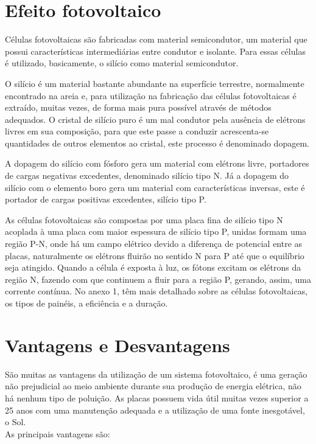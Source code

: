 \section{Efeito fotovoltaico}
Células fotovoltaicas são fabricadas com material semicondutor, um material que possui características intermediárias entre condutor e isolante. Para essas células é utilizado, basicamente, o silício como material semicondutor. 

\par O silício é um material bastante abundante na superfície terrestre, normalmente encontrado na areia e, para utilização na fabricação das células fotovoltaicas é extraído, muitas vezes, de forma mais pura possível através de métodos adequados. O cristal de silício puro é um mal condutor pela ausência de elétrons livres em sua composição, para que este passe a conduzir acrescenta-se quantidades de outros elementos ao cristal, este processo é denominado dopagem.

\par A dopagem do silício com fósforo gera um material com elétrons livre, portadores de cargas negativas excedentes, denominado silício tipo N. Já a dopagem do silício com o elemento boro gera um material com características inversas, este é portador de cargas positivas excedentes, silício tipo P.

\par As células fotovoltaicas são compostas por uma placa fina de silício tipo N acoplada à uma placa com maior espessura de silício tipo P, unidas formam uma região P-N, onde há um campo elétrico devido a diferença de potencial entre as placas, naturalmente os elétrons fluirão no sentido N para P até que o equilíbrio seja atingido. Quando a célula é exposta à luz, os fótons excitam os elétrons da região N, fazendo com que continuem a fluir para a região P, gerando, assim, uma corrente contínua. No anexo 1, têm mais detalhado sobre as células fotovoltaicas, os tipos de painéis, a eficiência e a duração.

\section{Vantagens e Desvantagens}
São muitas as vantagens da utilização de um sistema fotovoltaico, é uma geração não prejudicial ao meio ambiente durante sua produção de energia elétrica, não há nenhum tipo de poluição. As placas possuem vida útil muitas vezes superior a 25 anos com uma manutenção adequada e a utilização de uma fonte inesgotável, o Sol.
\\As principais vantagens são:

